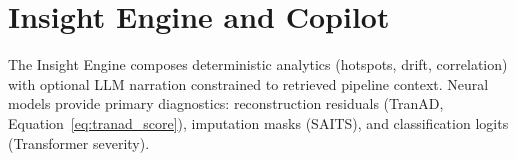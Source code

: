 \section{Insight Engine and Copilot}

The Insight Engine composes deterministic analytics (hotspots, drift, correlation) with optional LLM narration constrained to retrieved pipeline context. Neural models provide primary diagnostics: reconstruction residuals (TranAD, Equation~\ref{eq:tranad_score}), imputation masks (SAITS), and classification logits (Transformer severity).
